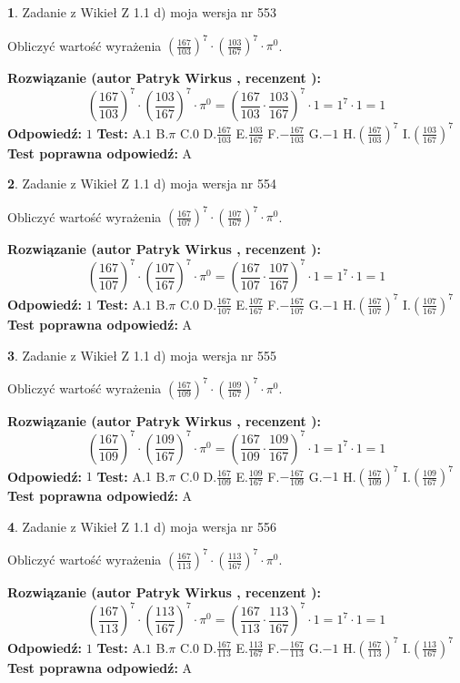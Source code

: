 \documentclass[12pt, a4paper]{article}
\theoremstyle{definition} %
\newtheorem{zad}{}
\newcommand{\zadStart}[1]{\begin{zad}#1\newline}
\newcommand{\zadStop}{\end{zad}}
\newcommand{\rozwStart}[2]{\noindent \textbf{Rozwiązanie (autor #1 , recenzent #2): }\newline}
\newcommand{\rozwStop}{\newline}
\newcommand{\odpStart}{\noindent \textbf{Odpowiedź:}\newline}
\newcommand{\odpStop}{\newline}
\newcommand{\testStart}{\noindent \textbf{Test:}\newline}
\newcommand{\testStop}{\newline}
\newcommand{\kluczStart}{\noindent \textbf{Test poprawna odpowiedź:}\newline}
\newcommand{\kluczStop}{\newline}
\begin{document}
\zadStart{Zadanie z Wikieł Z 1.1 d) moja wersja nr 553}

Obliczyć wartość wyrażenia $(\frac{167}{103})^{7} \cdot (\frac{103}{167})^{7} \cdot \pi^{0}$.
\zadStop
\rozwStart{Patryk Wirkus}{}
$$(\frac{167}{103})^{7} \cdot (\frac{103}{167})^{7} \cdot \pi^{0} = (\frac{167}{103} \cdot \frac{103}{167})^{7} \cdot 1 = 1^{7} \cdot 1 = 1$$
\rozwStop
\odpStart
$1$
\odpStop
\testStart
A.$1$ B.$\pi$ C.$0$ D.$\frac{167}{103}$ E.$\frac{103}{167}$
F.$-\frac{167}{103}$ G.$-1$
H.$(\frac{167}{103})^{7}$
I.$(\frac{103}{167})^{7}$
\testStop
\kluczStart
A
\kluczStop



\zadStart{Zadanie z Wikieł Z 1.1 d) moja wersja nr 554}

Obliczyć wartość wyrażenia $(\frac{167}{107})^{7} \cdot (\frac{107}{167})^{7} \cdot \pi^{0}$.
\zadStop
\rozwStart{Patryk Wirkus}{}
$$(\frac{167}{107})^{7} \cdot (\frac{107}{167})^{7} \cdot \pi^{0} = (\frac{167}{107} \cdot \frac{107}{167})^{7} \cdot 1 = 1^{7} \cdot 1 = 1$$
\rozwStop
\odpStart
$1$
\odpStop
\testStart
A.$1$ B.$\pi$ C.$0$ D.$\frac{167}{107}$ E.$\frac{107}{167}$
F.$-\frac{167}{107}$ G.$-1$
H.$(\frac{167}{107})^{7}$
I.$(\frac{107}{167})^{7}$
\testStop
\kluczStart
A
\kluczStop



\zadStart{Zadanie z Wikieł Z 1.1 d) moja wersja nr 555}

Obliczyć wartość wyrażenia $(\frac{167}{109})^{7} \cdot (\frac{109}{167})^{7} \cdot \pi^{0}$.
\zadStop
\rozwStart{Patryk Wirkus}{}
$$(\frac{167}{109})^{7} \cdot (\frac{109}{167})^{7} \cdot \pi^{0} = (\frac{167}{109} \cdot \frac{109}{167})^{7} \cdot 1 = 1^{7} \cdot 1 = 1$$
\rozwStop
\odpStart
$1$
\odpStop
\testStart
A.$1$ B.$\pi$ C.$0$ D.$\frac{167}{109}$ E.$\frac{109}{167}$
F.$-\frac{167}{109}$ G.$-1$
H.$(\frac{167}{109})^{7}$
I.$(\frac{109}{167})^{7}$
\testStop
\kluczStart
A
\kluczStop



\zadStart{Zadanie z Wikieł Z 1.1 d) moja wersja nr 556}

Obliczyć wartość wyrażenia $(\frac{167}{113})^{7} \cdot (\frac{113}{167})^{7} \cdot \pi^{0}$.
\zadStop
\rozwStart{Patryk Wirkus}{}
$$(\frac{167}{113})^{7} \cdot (\frac{113}{167})^{7} \cdot \pi^{0} = (\frac{167}{113} \cdot \frac{113}{167})^{7} \cdot 1 = 1^{7} \cdot 1 = 1$$
\rozwStop
\odpStart
$1$
\odpStop
\testStart
A.$1$ B.$\pi$ C.$0$ D.$\frac{167}{113}$ E.$\frac{113}{167}$
F.$-\frac{167}{113}$ G.$-1$
H.$(\frac{167}{113})^{7}$
I.$(\frac{113}{167})^{7}$
\testStop
\kluczStart
A
\kluczStop
\end{document}
